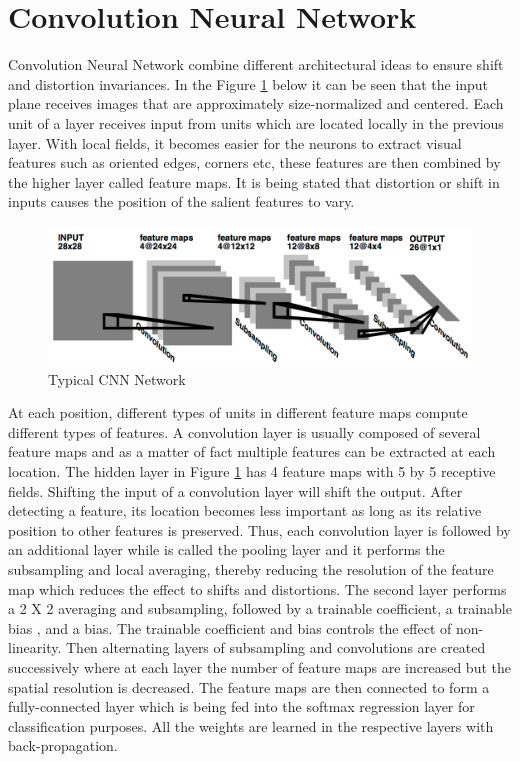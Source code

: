 \section{Convolution Neural Network} \label{sec:build5}

Convolution Neural Network \cite{cnn} combine different architectural ideas to ensure  shift and distortion invariances. In the Figure \ref{fig:Figure19} below it  can be seen that the input plane receives images that are approximately size-normalized and centered. Each unit of a layer receives input from units which are located locally in the previous layer. With local fields, it becomes easier for the neurons to extract visual features such as oriented edges, corners etc, these features are then combined by the higher layer called feature maps. It is being stated that distortion or shift in inputs causes the position of the salient features to vary. 

\begin{figure}[t]
	\begin{center}
		\includegraphics[width=\textwidth]{Figures/Figure19}
	\end{center}
	\caption{Typical CNN Network}
	\label{fig:Figure19}
\end{figure}


At each position, different types of units in different feature maps compute different types of features. A convolution layer is usually composed of several feature maps and as a matter of fact multiple features can be extracted at each location. The hidden layer in Figure \ref{fig:Figure19} has 4 feature maps with 5 by 5 receptive fields. Shifting the input of a convolution layer will shift the output. After detecting a feature, its location becomes less important as long as its relative position to other features is preserved. Thus, each convolution layer is followed by an additional layer while is called the pooling layer and it performs the subsampling and local averaging, thereby reducing the resolution of the feature map which reduces the effect to shifts and distortions. The second layer performs a 2 X 2 averaging and subsampling, followed by a trainable coefficient, a trainable bias , and a bias. The trainable coefficient and bias controls the effect of non-linearity. Then alternating layers of subsampling and convolutions are created successively where at each layer the number of feature maps are increased but the spatial resolution is decreased. The feature maps are then connected to form a fully-connected layer which is being fed into the softmax regression layer for classification purposes. All the weights are learned in the respective layers with back-propagation.

